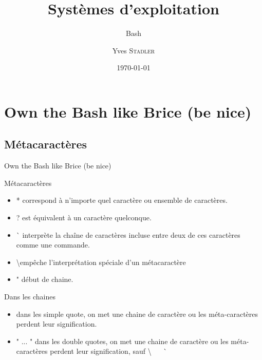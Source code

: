
\title{Systèmes d'exploitation}
\subtitle{Bash}

\author{Yves \textsc{Stadler}}

\date{\today}




\begin{frame}
\titlepage
\end{frame}




\def\sectitle{Own the Bash like Brice (be nice)}
\section{\sectitle}
\def\subsectitle{Métacaractères}
\subsection{\subsectitle}



\begin{frame}{\sectitle}

\begin{block}{\subsectitle}
\begin{itemize}
\item * correspond à n'importe quel caractère ou ensemble de caractères.
\item ? est équivalent à un caractère quelconque.
\item \`{} interprète la chaîne de caractères incluse entre deux de ces caractères comme une commande.
\item \textbackslash  empêche l'interprétation spéciale d'un métacaractère
\item " début de chaine.
\end{itemize}
\end{block}


\def\subsectitle{Dans les chaines}
\begin{block}{\subsectitle}
\begin{itemize}
\item  dans les simple quote, on met une chaine de caractère ou les méta-caractères perdent leur signification.
\item " ... " dans les double quotes, on met une chaine de caractère ou les méta-caractères perdent leur signification, sauf \textbackslash ~ \textquotedbl ~ \`{} ~ \textdollar
\end{itemize}
\end{block}
\end{frame}


